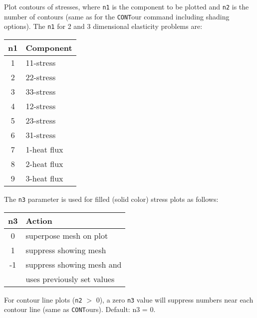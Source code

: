 \headb

Plot contours of stresses, where {\tt n1} is the component
to be plotted and {\tt n2} is the number of contours (same as
for the {\tt CONT}our command including shading options).
The {\tt n1} for 2 and 3
dimensional elasticity problems are:

\begin{center}
\begin{tabular}{c | l }
  n1 & Component \\ \hline
   1 & 11-stress \\
   2 & 22-stress \\
   3 & 33-stress \\
   4 & 12-stress \\
   5 & 23-stress \\
   6 & 31-stress \\
   7 & 1-heat flux \\
   8 & 2-heat flux \\
   9 & 3-heat flux
\end{tabular}
\end{center}

The {\tt n3} parameter is used for filled (solid color) stress
plots as follows:

\begin{center}
\begin{tabular}{c | l }
  n3 & Action \\ \hline
   0 & superpose mesh on plot \\
   1 & suppress showing mesh \\
  -1 & suppress showing mesh and \\
     & uses previously set values
\end{tabular}
\end{center}

For contour line plots ({\tt n2} $>$ 0), a zero {\tt n3} value will
suppress numbers near each contour line (same as
{\tt CONT}ours). Default: n3 = 0.
\vfill
\eject
